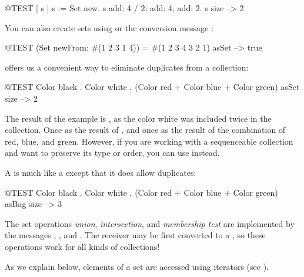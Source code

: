 \documentclass[a4paper,10pt,twoside]{book}
\begin{document}
\begin{code}{@TEST | s | }
s := Set new.
s add: 4 / 2; add: 4; add: 2.
s size --> 2
\end{code}

You can also create sets using  or the conversion message :

\begin{code}{@TEST}
(Set newFrom: #(1 2 3 1 4)) = #(1 2 3 4 3 2 1) asSet --> true
\end{code}

 offers us a convenient way to eliminate duplicates from a collection:

\begin{code}{@TEST}
{Color black . Color white . (Color red + Color blue + Color green)} asSet size --> 2
\end{code}

\noindent
The result of the example is , as the color white was included twice in the collection. Once as the result of , and once as the result of the combination of red, blue, and green.
However, if you are working with a sequenceable collection and want to preserve its type or order, you can use  instead.

A  is much like a  except that it does allow duplicates:
\begin{code}{@TEST}
{Color black . Color white . (Color red + Color blue + Color green)} asBag size --> 3
\end{code}

The set operations \emph{union}, \emph{intersection}, and \emph{membership test} are implemented by the  messages , , and .
The receiver may be first converted to a , so these operations work for all kinds of collections!


As we explain below, elements of a set are accessed using iterators (see ).
\end{document}
